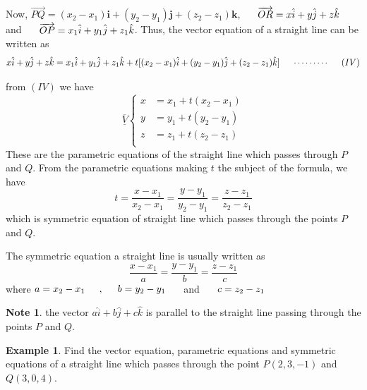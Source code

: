 \documentclass[11pt,a4paper]{article}
\theoremstyle{definition}
\newtheorem{exa}[thm]{Example}
\newtheorem*{note}{Note}
\begin{document}
Now, $\overrightarrow{PQ} = (x_2 -x_1)\textbf{i} + (y_2 -y_1)\textbf{j} + (z_2 -z_1)\textbf{k}$, $\hspace{0.5cm} \overrightarrow{OR} = x \hat{i} + y\hat{j} + z\hat{k}\hspace{0.5cm}$ and $\hspace{0.5cm}\overrightarrow{OP} = x_1\hat{i} + y_1\hat{j} + z_1\hat{k}$. Thus, the vector equation of a straight line can be written as 
$$x\hat{i} + y\hat{j} + z \hat{k} = x_1 \hat{i} + y_1\hat{j} + z_1\hat{k} + t[(x_2 -x_1)\hat{i}  +   (y_2 -y_1)\hat{j}    + (z_2 -z_1)\hat{k}] \hspace{0.5cm} \cdots\cdots\cdots\hspace{0.5cm} (IV)$$ 

from $(IV)$ we have 
\[\overline{\underline{V}}
\begin{cases}
x & = x_1 + t(x_2 - x_1)\\
y & = y_1 + t(y_2 - y_1)\\
z & = z_1 + t(z_2 -z_1)\\
\end{cases}
\] 
These are the parametric equations of the straight line which passes through $P$ and $Q$. From the parametric equations making $t$ the subject of the formula, we have
$$t = \frac{x - x_1}{x_2 - x_1} =  \frac{y - y_1}{y_2 - y_1} =  \frac{z - z_1}{z_2 - z_1}$$
which is symmetric equation of straight line which passes through the points $P$ and $Q$.


The symmetric equation a straight line is usually written as 
$$\frac{x - x_1}{a} = \frac{y - y_1}{b} = \frac{z - z_1}{c}$$
where $a = x_2 -x_1\hspace{0.5cm}, \hspace{0.5cm} b = y_2 - y_1 \hspace{0.5cm} $ and $\hspace{0.5cm} c = z_2 - z_1$


\begin{note}
the vector $a\hat{i} + b\hat{j} + c\hat{k}$ is parallel to the straight line passing through the points $P$ and $Q$.
\end{note}


\begin{exa}


Find the vector equation, parametric equations and symmetric equations of a straight line which passes through the point $P(2,3,-1)$ and $Q(3,0,4)$.
\end{exa}
\end{document}
